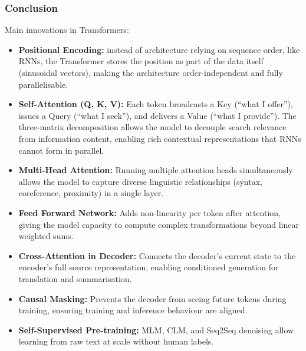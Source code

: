 			

\begin{frame}[fragile]\frametitle{Conclusion}

Main innovations in Transformers:
\begin{itemize}
\item \textbf{Positional Encoding:} instead of architecture relying on sequence order, like RNNs, the Transformer stores the position as part of the data itself (sinusoidal vectors), making the architecture order-independent and fully parallelisable.
\item \textbf{Self-Attention (Q, K, V):} Each token broadcasts a Key (``what I offer''), issues a Query (``what I seek''), and delivers a Value (``what I provide''). The three-matrix decomposition allows the model to decouple search relevance from information content, enabling rich contextual representations that RNNs cannot form in parallel.
\item \textbf{Multi-Head Attention:} Running multiple attention heads simultaneously allows the model to capture diverse linguistic relationships (syntax, coreference, proximity) in a single layer.
\item \textbf{Feed Forward Network:} Adds non-linearity per token after attention, giving the model capacity to compute complex transformations beyond linear weighted sums.
\item \textbf{Cross-Attention in Decoder:} Connects the decoder's current state to the encoder's full source representation, enabling conditioned generation for translation and summarisation.
\item \textbf{Causal Masking:} Prevents the decoder from seeing future tokens during training, ensuring training and inference behaviour are aligned.
\item \textbf{Self-Supervised Pre-training:} MLM, CLM, and Seq2Seq denoising allow learning from raw text at scale without human labels.
\end{itemize}
			
\end{frame}


			
			
